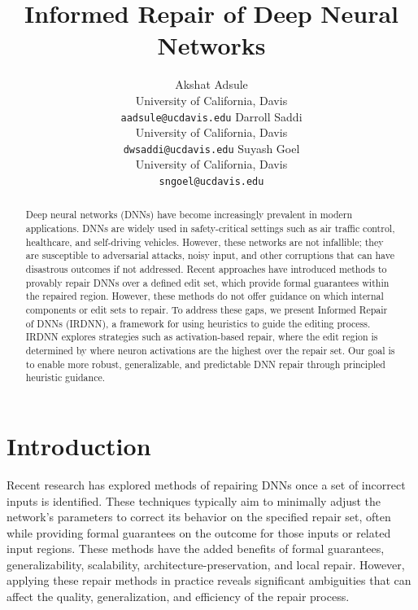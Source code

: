 \documentclass{article}
\title{Informed Repair of Deep Neural Networks}
\begin{document}
\author{
	Akshat Adsule \\
	University of California, Davis \\
	\texttt{aadsule@ucdavis.edu}
	\And
	Darroll Saddi \\
	University of California, Davis \\
	\texttt{dwsaddi@ucdavis.edu}
	\And
	Suyash Goel \\
	University of California, Davis \\
	\texttt{sngoel@ucdavis.edu}
}

\maketitle

\begin{abstract}
Deep neural networks (DNNs) have become increasingly prevalent in modern applications.
DNNs are widely used in safety-critical settings such as air traffic control, healthcare, and self-driving vehicles.
However, these networks are not infallible; they are susceptible to adversarial attacks, noisy input, and other corruptions that can have disastrous outcomes if not addressed.
Recent approaches have introduced methods to provably repair DNNs over a defined edit set, which provide formal guarantees within the repaired region.
However, these methods do not offer guidance on which internal components or edit sets to repair.
To address these gaps, we present Informed Repair of DNNs (IRDNN), a framework for using heuristics to guide the editing process.
IRDNN explores strategies such as activation-based repair, where the edit region is determined by where neuron activations are the highest over the repair set.
Our goal is to enable more robust, generalizable, and predictable DNN repair through principled heuristic guidance.
\end{abstract}

\section{Introduction}

Recent research \citep{nawas_provable_2024, sotoudeh_provable_2021, tao_architecture-preserving_2023} has explored methods of repairing DNNs once a set of incorrect inputs is identified.
These techniques typically aim to minimally adjust the network's parameters to correct its behavior on the specified repair set, often while providing formal guarantees on the outcome for those inputs or related input regions.
These methods have the added benefits of formal guarantees, generalizability, scalability, architecture-preservation, and local repair.
However, applying these repair methods in practice reveals significant ambiguities that can affect the quality, generalization, and efficiency of the repair process.
\end{document}
